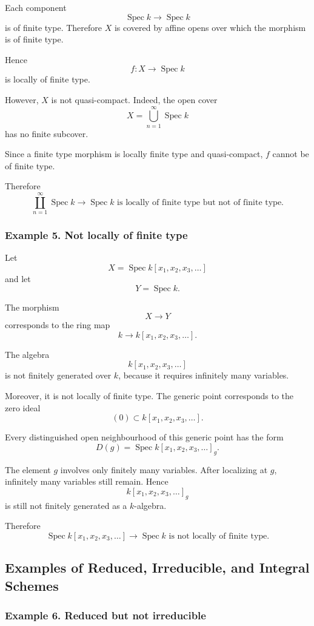 \documentclass[12pt,a4paper]{article}
\theoremstyle{notespace}
\begin{document}
Each component
\[
\operatorname{Spec}k\to \operatorname{Spec}k
\]
is of finite type. Therefore \(X\) is covered by affine opens over which the morphism is of finite type.

Hence
\[
f:X\to \operatorname{Spec}k
\]
is locally of finite type.

However, \(X\) is not quasi-compact. Indeed, the open cover
\[
X=\bigcup_{n=1}^{\infty}\operatorname{Spec}k
\]
has no finite subcover.

Since a finite type morphism is locally finite type and quasi-compact, \(f\) cannot be of finite type.

Therefore
\[
\boxed{
	\coprod_{n=1}^{\infty}\operatorname{Spec}k
	\to
	\operatorname{Spec}k
	\text{ is locally of finite type but not of finite type.}
}
\]

\subsubsection*{Example 5. Not locally of finite type}

Let
\[
X=\operatorname{Spec}k[x_1,x_2,x_3,\dots]
\]
and let
\[
Y=\operatorname{Spec}k.
\]

The morphism
\[
X\to Y
\]
corresponds to the ring map
\[
k\to k[x_1,x_2,x_3,\dots].
\]

The algebra
\[
k[x_1,x_2,x_3,\dots]
\]
is not finitely generated over \(k\), because it requires infinitely many variables.

Moreover, it is not locally of finite type. The generic point corresponds to the zero ideal
\[
(0)\subset k[x_1,x_2,x_3,\dots].
\]

Every distinguished open neighbourhood of this generic point has the form
\[
D(g)=\operatorname{Spec}k[x_1,x_2,x_3,\dots]_g.
\]

The element \(g\) involves only finitely many variables. After localizing at \(g\), infinitely many variables still remain. Hence
\[
k[x_1,x_2,x_3,\dots]_g
\]
is still not finitely generated as a \(k\)-algebra.

Therefore
\[
\boxed{
	\operatorname{Spec}k[x_1,x_2,x_3,\dots]
	\to
	\operatorname{Spec}k
	\text{ is not locally of finite type.}
}
\]

\subsection{Examples of Reduced, Irreducible, and Integral Schemes}

\subsubsection*{Example 6. Reduced but not irreducible}
\end{document}
